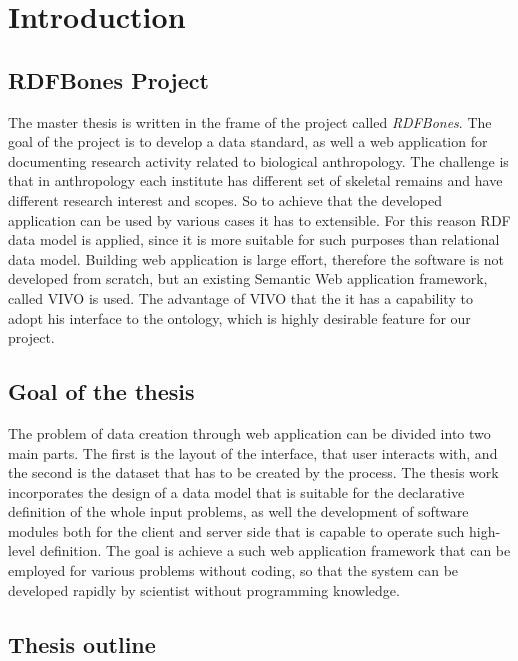 \chapter{Introduction}


\section{RDFBones Project}

The master thesis is written in the frame of the project called \textit{RDFBones}. The goal of the project is to develop a data standard, as well a web application for documenting research activity related to biological anthropology. The challenge is that in anthropology each institute has different set of skeletal remains and have different research interest and scopes. So to achieve that the developed application can be used by various cases it has to extensible. For this reason RDF data model is applied, since it is more suitable for such purposes than relational data model.\cite{infrastructure}
Building web application is large effort, therefore the software is not developed from scratch, but an existing Semantic Web application framework, called VIVO is used. The advantage of VIVO that the it has a capability to adopt his interface to the ontology, which is highly desirable feature for our project. 


\section{Goal of the thesis}

The problem of data creation through web application can be divided into two main parts. The first is the layout of the interface, that user interacts with, and the second is the dataset that has to be created by the process. The thesis work incorporates the design of a data model that is suitable for the declarative definition of the whole input problems, as well the development of software modules both for the client and server side that is capable to operate such high-level definition. The goal is achieve a such web application framework that can be employed for various problems without coding, so that the system can be developed rapidly by scientist without programming knowledge.


\section{Thesis outline}

